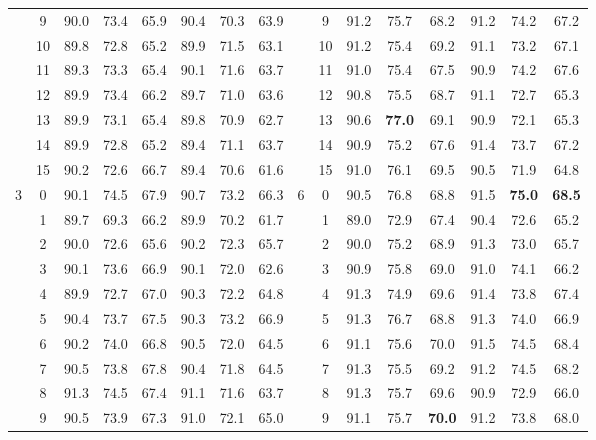 \begin{table}[p]
{\begin{tabular}{c c | c c c | c c c || c c | c c c | c c c}
             & 9 & 90.0 & 73.4 & 65.9 & 90.4 & 70.3 & 63.9 &  & 9 & 91.2 & 75.7 & 68.2 & 91.2 & 74.2 & 67.2 \\
             & 10 & 89.8 & 72.8 & 65.2 & 89.9 & 71.5 & 63.1 &  & 10 & 91.2 & 75.4 & 69.2 & 91.1 & 73.2 & 67.1 \\
             & 11 & 89.3 & 73.3 & 65.4 & 90.1 & 71.6 & 63.7 &  & 11 & 91.0 & 75.4 & 67.5 & 90.9 & 74.2 & 67.6 \\
             & 12 & 89.9 & 73.4 & 66.2 & 89.7 & 71.0 & 63.6 &  & 12 & 90.8 & 75.5 & 68.7 & 91.1 & 72.7 & 65.3 \\
             & 13 & 89.9 & 73.1 & 65.4 & 89.8 & 70.9 & 62.7 &  & 13 & 90.6 & \textbf{77.0} & 69.1 & 90.9 & 72.1 & 65.3 \\
             & 14 & 89.9 & 72.8 & 65.2 & 89.4 & 71.1 & 63.7 &  & 14 & 90.9 & 75.2 & 67.6 & 91.4 & 73.7 & 67.2 \\
             & 15 & 90.2 & 72.6 & 66.7 & 89.4 & 70.6 & 61.6 &  & 15 & 91.0 & 76.1 & 69.5 & 90.5 & 71.9 & 64.8 \\
            \midrule
            \multirow{16}{*}{3} & 0 & 90.1 & 74.5 & 67.9 & 90.7 & 73.2 & 66.3 & \multirow{16}{*}{6} & 0 & 90.5 & 76.8 & 68.8 & 91.5 & \textbf{75.0} & \textbf{68.5} \\
             & 1 & 89.7 & 69.3 & 66.2 & 89.9 & 70.2 & 61.7 &  & 1 & 89.0 & 72.9 & 67.4 & 90.4 & 72.6 & 65.2 \\
             & 2 & 90.0 & 72.6 & 65.6 & 90.2 & 72.3 & 65.7 &  & 2 & 90.0 & 75.2 & 68.9 & 91.3 & 73.0 & 65.7 \\
             & 3 & 90.1 & 73.6 & 66.9 & 90.1 & 72.0 & 62.6 &  & 3 & 90.9 & 75.8 & 69.0 & 91.0 & 74.1 & 66.2 \\
             & 4 & 89.9 & 72.7 & 67.0 & 90.3 & 72.2 & 64.8 &  & 4 & 91.3 & 74.9 & 69.6 & 91.4 & 73.8 & 67.4 \\
             & 5 & 90.4 & 73.7 & 67.5 & 90.3 & 73.2 & 66.9 &  & 5 & 91.3 & 76.7 & 68.8 & 91.3 & 74.0 & 66.9 \\
             & 6 & 90.2 & 74.0 & 66.8 & 90.5 & 72.0 & 64.5 &  & 6 & 91.1 & 75.6 & 70.0 & 91.5 & 74.5 & 68.4 \\
             & 7 & 90.5 & 73.8 & 67.8 & 90.4 & 71.8 & 64.5 &  & 7 & 91.3 & 75.5 & 69.2 & 91.2 & 74.5 & 68.2 \\
             & 8 & 91.3 & 74.5 & 67.4 & 91.1 & 71.6 & 63.7 &  & 8 & 91.3 & 75.7 & 69.6 & 90.9 & 72.9 & 66.0 \\
             & 9 & 90.5 & 73.9 & 67.3 & 91.0 & 72.1 & 65.0 &  & 9 & 91.1 & 75.7 & \textbf{70.0} & 91.2 & 73.8 & 68.0 \\

\end{tabular}}
\end{table}
